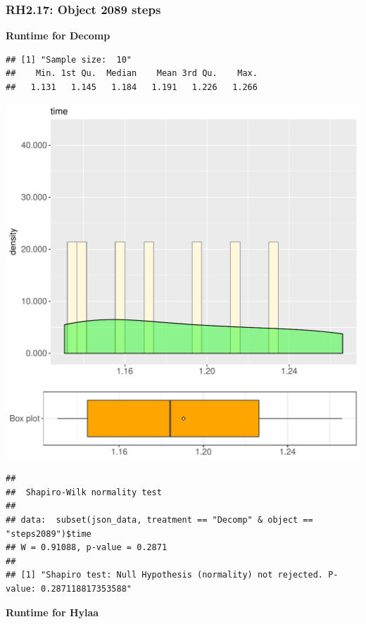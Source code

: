 \documentclass{article}\usepackage[]{graphicx}\usepackage[]{color}
\makeatletter
\def\maxwidth{ %
  \ifdim\Gin@nat@width>\linewidth
    \linewidth
  \else
    \Gin@nat@width
  \fi
}
\newenvironment{kframe}{%
 \def\at@end@of@kframe{}%
 \ifinner\ifhmode%
  \def\at@end@of@kframe{\end{minipage}}%
  \begin{minipage}{\columnwidth}%
 \fi\fi%
 \def\FrameCommand##1{\hskip\@totalleftmargin \hskip-\fboxsep
 \colorbox{shadecolor}{##1}\hskip-\fboxsep
     \hskip-\linewidth \hskip-\@totalleftmargin \hskip\columnwidth}%
 \MakeFramed {\advance\hsize-\width
   \@totalleftmargin\z@ \linewidth\hsize
   \@setminipage}}%
 {\par\unskip\endMakeFramed%
 \at@end@of@kframe}
\newenvironment{knitrout}{}{} %
\makeatother
\begin{document}
\subsubsection{RH2.17: Object 2089 steps}

 \textbf{Runtime for Decomp}
\begin{knitrout}
\color{fgcolor}\begin{kframe}
\begin{verbatim}
## [1] "Sample size:  10"
##    Min. 1st Qu.  Median    Mean 3rd Qu.    Max. 
##   1.131   1.145   1.184   1.191   1.226   1.266
\end{verbatim}
\end{kframe}
\includegraphics[width=\maxwidth]{figure/RH2_Decomp_steps2089-1} 
\begin{kframe}\begin{verbatim}
## 
## 	Shapiro-Wilk normality test
## 
## data:  subset(json_data, treatment == "Decomp" & object == "steps2089")$time
## W = 0.91088, p-value = 0.2871
## 
## [1] "Shapiro test: Null Hypothesis (normality) not rejected. P-value: 0.287118817353588"
\end{verbatim}
\end{kframe}
\end{knitrout}
 \textbf{Runtime for Hylaa}
\end{document}

